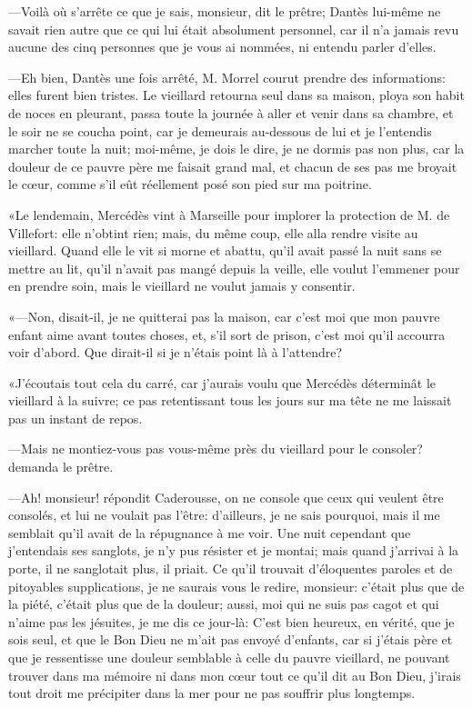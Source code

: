 —Voilà où s'arrête ce que je sais, monsieur, dit le prêtre; Dantès lui-même ne savait rien autre que ce qui lui était absolument personnel, car il n'a jamais revu aucune des cinq personnes que je vous ai nommées, ni entendu parler d'elles.

—Eh bien, Dantès une fois arrêté, M. Morrel courut prendre des informations: elles furent bien tristes. Le vieillard retourna seul dans sa maison, ploya son habit de noces en pleurant, passa toute la journée à aller et venir dans sa chambre, et le soir ne se coucha point, car je demeurais au-dessous de lui et je l'entendis marcher toute la nuit; moi-même, je dois le dire, je ne dormis pas non plus, car la douleur de ce pauvre père me faisait grand mal, et chacun de ses pas me broyait le cœur, comme s'il eût réellement posé son pied sur ma poitrine.

«Le lendemain, Mercédès vint à Marseille pour implorer la protection de M. de Villefort: elle n'obtint rien; mais, du même coup, elle alla rendre visite au vieillard. Quand elle le vit si morne et abattu, qu'il avait passé la nuit sans se mettre au lit, qu'il n'avait pas mangé depuis la veille, elle voulut l'emmener pour en prendre soin, mais le vieillard ne voulut jamais y consentir.

«—Non, disait-il, je ne quitterai pas la maison, car c'est moi que mon pauvre enfant aime avant toutes choses, et, s'il sort de prison, c'est moi qu'il accourra voir d'abord. Que dirait-il si je n'étais point là à l'attendre?

«J'écoutais tout cela du carré, car j'aurais voulu que Mercédès déterminât le vieillard à la suivre; ce pas retentissant tous les jours sur ma tête ne me laissait pas un instant de repos.

—Mais ne montiez-vous pas vous-même près du vieillard pour le consoler? demanda le prêtre.

—Ah! monsieur! répondit Caderousse, on ne console que ceux qui veulent être consolés, et lui ne voulait pas l'être: d'ailleurs, je ne sais pourquoi, mais il me semblait qu'il avait de la répugnance à me voir. Une nuit cependant que j'entendais ses sanglots, je n'y pus résister et je montai; mais quand j'arrivai à la porte, il ne sanglotait plus, il priait. Ce qu'il trouvait d'éloquentes paroles et de pitoyables supplications, je ne saurais vous le redire, monsieur: c'était plus que de la piété, c'était plus que de la douleur; aussi, moi qui ne suis pas cagot et qui n'aime pas les jésuites, je me dis ce jour-là: C'est bien heureux, en vérité, que je sois seul, et que le Bon Dieu ne m'ait pas envoyé d'enfants, car si j'étais père et que je ressentisse une douleur semblable à celle du pauvre vieillard, ne pouvant trouver dans ma mémoire ni dans mon cœur tout ce qu'il dit au Bon Dieu, j'irais tout droit me précipiter dans la mer pour ne pas souffrir plus longtemps.

